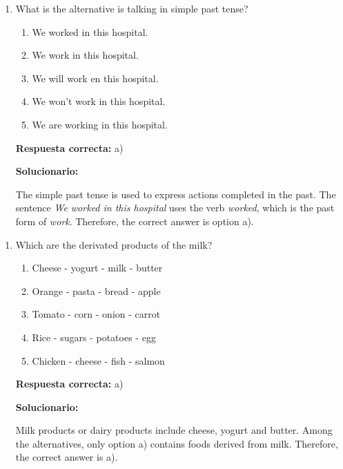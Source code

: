 \begin{enumerate}
	
	\item What is the alternative is talking in simple past tense?
	
	\begin{enumerate}[label=\alph*)]
		\item We worked in this hospital.
		\item We work in this hospital.
		\item We will work en this hospital.
		\item We won't work in this hospital.
		\item We are working in this hospital.
	\end{enumerate}
	
	\textbf{Respuesta correcta:} a)
	
	\vspace{2mm}
	\textbf{Solucionario:}
	
	The simple past tense is used to express actions completed in the past. The sentence \textit{We worked in this hospital} uses the verb \textit{worked}, which is the past form of \textit{work}. Therefore, the correct answer is option a).
	
\end{enumerate}

\begin{enumerate}[resume]
	
	\item Which are the derivated products of the milk?
	
	\begin{enumerate}[label=\alph*)]
		\item Cheese - yogurt - milk - butter
		\item Orange - pasta - bread - apple
		\item Tomato - corn - onion - carrot
		\item Rice - sugars - potatoes - egg
		\item Chicken - cheese - fish - salmon
	\end{enumerate}
	
	\textbf{Respuesta correcta:} a)
	
	\vspace{2mm}
	\textbf{Solucionario:}
	
	Milk products or dairy products include cheese, yogurt and butter. Among the alternatives, only option a) contains foods derived from milk. Therefore, the correct answer is a).
	
\end{enumerate}



